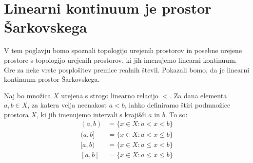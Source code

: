\documentclass[mat2]{fmfdelo}
\begin{document}


\section{Linearni kontinuum je prostor Šarkovskega}
V tem poglavju bomo spoznali topologijo urejenih prostorov in posebne urejene prostore s topologijo urejenih prostorov, ki jih imenujemo linearni kontinuum. Gre za neke vrste posplošitev premice realnih števil. Pokazali bomo, da je linearni kontinuum prostor Šarkovskega.

Naj bo množica $X$ urejena s strogo linearno relacijo $<$. Za dana elementa $a, b \in X$, za katera velja neenakost $a<b$, lahko definiramo štiri podmnožice prostora $X$, ki jih imenujemo intervali s krajišči $a$ in $b$. To so:
\begin{equation*} %
\begin{split}
(a, b) &= \{x \in X: a< x <b\} \\ 
(a, b] &= \{x \in X: a< x \leq b\} \\ 
[a, b) &= \{x \in X: a \leq x< b\} \\ 
[a, b] &= \{x \in X: a \leq x \leq b\}
\end{split}
\end{equation*}
\end{document}
